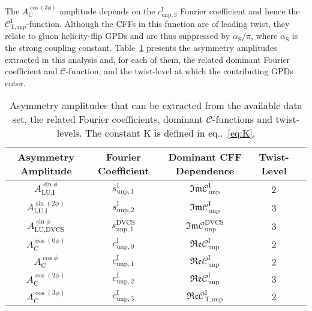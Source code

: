 The $A^{\cos(3\phi)}_{\textrm{C}}$ amplitude depends on the
$c_{\textrm{unp},3}^{\textrm{I}}$ Fourier coefficient and hence the
$\mathcal{C}_{\textrm{T,unp}}^{\textrm{I}}$-function. Although the CFFs
in this function are of leading twist, they relate to gluon helicity-flip GPDs and are thus suppressed by $\alpha_{\textrm{S}}/\pi$, where $\alpha_{\textrm{S}}$ is the strong coupling constant. Table~\ref{tab_amplitudes} presents the asymmetry amplitudes extracted in this analysis and, for each of them, the
related dominant Fourier coefficient and $\mathcal{C}$-function, and the twist-level at which the contributing GPDs enter.
\begin{table}
\begin{center}
\resizebox{\textwidth}{!} {
\begin{tabular}{|c|c|c|c|c|}
\hline
Asymmetry Amplitude& Fourier Coefficient& Dominant CFF Dependence & Twist-Level   \\ 
\hline
\hline
$A_{\textrm{LU,I}}^{\sin\phi}$ & $s_{\textrm{unp},1}^{\textrm{I}}$  &
$\mathfrak{Im}\mathcal{C}_{\textrm{unp}}^{\textrm{I}}$
&  2 \\
\hline
$A_{\textrm{LU,I}}^{\sin(2\phi)}$ & $s_{\textrm{unp},2}^{\textrm{I}}$ 
&
$\mathfrak{Im}\mathcal{C}_{\textrm{unp}}^{\textrm{I}}$
&  3 \\
\hline
\hline
$A_{\textrm{LU,DVCS}}^{\sin\phi}$ & $s_{\textrm{unp},1}^{\textrm{DVCS}}$ &
$\mathfrak{Im}\mathcal{C}_{\textrm{unp}}^{\textrm{DVCS}}$ &  3 \\
\hline
\hline
$A_{\textrm{C}}^{\cos(0\phi)}$ & $c_{\textrm{unp},0}^{\textrm{I}}$  &
$\mathfrak{Re}\mathcal{C}_{\textrm{unp}}^{\textrm{I}}$ & 2
\\
\hline
$A_{\textrm{C}}^{\cos\phi}$ & $c_{\textrm{unp},1}^{\textrm{I}}$  &
$\mathfrak{Re}\mathcal{C}_{\textrm{unp}}^{\textrm{I}}$ & 2
\\
\hline
$A_{\textrm{C}}^{\cos(2\phi)}$ & $c_{\textrm{unp},2}^{\textrm{I}}$ &
$\mathfrak{Re}\mathcal{C}_{\textrm{unp}}^{\textrm{I}}$ & 3 \\
\hline
$A_{\textrm{C}}^{\cos(3\phi)}$ & $c_{\textrm{unp},3}^{\textrm{I}}$ &
$\mathfrak{Re}\mathcal{C}_{\textrm{T,unp}}^{\textrm{I}}$ &  2 \\
\hline
 \end{tabular}
}
\caption{Asymmetry amplitudes that can
be extracted from the available data set, the related Fourier
coefficients, dominant $\mathcal{C}$-functions and twist-levels. {The constant K is defined in eq..~\ref{eq:K}}.}
\label{tab_amplitudes}
\end{center}
\end{table}
 
